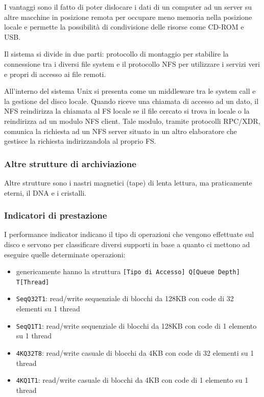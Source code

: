\documentclass[a4paper]{article}
\begin{document}
I vantaggi sono il fatto di poter dislocare i dati di un computer ad un server su altre macchine in posizione remota per occupare
meno memoria nella posizione locale e permette la possibilità di condivisione delle risorse come CD-ROM e USB.

Il sistema si divide in due parti: protocollo di montaggio per stabilire la connessione tra i diversi file system e il protocollo
NFS per utilizzare i servizi veri e propri di accesso ai file remoti.

All'interno del sistema Unix si presenta come un middleware tra le system call e la gestione del disco locale. Quando riceve
una chiamata di accesso ad un dato, il NFS reindirizza la chiamata al FS locale se il file cercato si trova in locale o
la reindirizza ad un modulo NFS client. Tale modulo, tramite protocolli RPC/XDR, comunica la richiesta ad un NFS server
situato in un altro elaboratore che gestisce la richiesta indirizzandola al proprio FS.

\subsubsection*{Altre strutture di archiviazione}
Altre strutture sono i nastri magnetici (tape) di lenta lettura, ma praticamente eterni, il DNA e i cristalli.

\subsubsection*{Indicatori di prestazione}
I performance indicator indicano il tipo di operazioni che vengono effettuate sul disco e servono per classificare diversi
supporti in base a quanto ci mettono ad eseguire quelle determinate operazioni:
\begin{itemize}
	\item genericamente hanno la struttura \verb|[Tipo di Accesso] Q[Queue Depth] T[Thread]|
	\item \texttt{SeqQ32T1}: read/write sequenziale di blocchi da 128KB con code di 32 elementi su 1 thread
	\item \texttt{SeqQ1T1}: read/write sequenziale di blocchi da 128KB con code di 1 elemento su 1 thread
	\item \texttt{4KQ32T8}: read/write casuale di blocchi da 4KB con code di 32 elementi su 1 thread
	\item \texttt{4KQ1T1}: read/write casuale di blocchi da 4KB con code di 1 elemento su 1 thread
\end{itemize}
\end{document}
